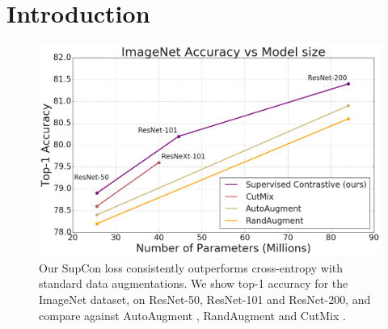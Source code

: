 
\section{Introduction}
\begin{figure}
\vspace{-35pt}
\centering
\includegraphics[width=\linewidth]{./figs/teaser_fig2}
{\caption{\small Our SupCon loss consistently outperforms cross-entropy with standard data augmentations. We show top-1 accuracy for the ImageNet dataset, on ResNet-50, ResNet-101 and ResNet-200, and compare against AutoAugment \cite{cubuk2019autoaugment}, RandAugment \cite{cubuk2019randaugment} and CutMix \cite{yun2019cutmix}. 
}
\label{fig:imagenet_top1_teaser} }
\vspace{-47pt}
\end{figure}


